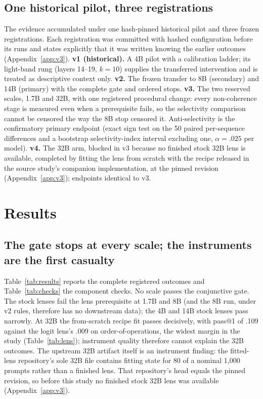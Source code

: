 \documentclass{article}
\begin{document}
\subsection{One historical pilot, three registrations}

The evidence accumulated under one hash-pinned historical pilot and three frozen
registrations. Each registration was committed with hashed configuration before its runs
and states explicitly that it was written knowing the earlier outcomes (Appendix~\ref{app:v3}).
\textbf{v1 (historical).} A 4B pilot with a calibration ladder; its light-band rung
(layers 14--19, $k=10$) supplies the transferred intervention and is treated as
descriptive context only. \textbf{v2.} The frozen transfer to 8B (secondary) and 14B
(primary) with the complete gate and ordered stops. \textbf{v3.} The two reserved scales,
1.7B and 32B, with one registered procedural change: every non-coherence stage is measured
even when a prerequisite fails, so the selectivity comparison cannot be censored the way
the 8B stop censored it. Anti-selectivity is the confirmatory primary endpoint (exact sign
test on the 50 paired per-sequence differences and a bootstrap selectivity-index interval
excluding one, $\alpha=.025$ per model). \textbf{v4.} The 32B arm, blocked in v3 because
no finished stock 32B lens is available, completed by fitting
the lens from scratch with the recipe released in the source study's companion
implementation, at the pinned revision (Appendix~\ref{app:v3}); endpoints identical to v3.

\section{Results}

\subsection{The gate stops at every scale; the instruments are the first casualty}

Table~\ref{tab:results} reports the complete registered outcomes and
Table~\ref{tab:checks} the component checks. No scale passes the conjunctive gate. The
stock lenses fail the lens prerequisite at 1.7B and 8B (and the 8B run, under v2 rules,
therefore has no downstream data); the 4B and 14B stock lenses pass narrowly. At 32B the
from-scratch recipe fit passes decisively, with pass@1 of .109 against the logit lens's
.009 on order-of-operations, the widest margin in the study (Table~\ref{tab:lens});
instrument quality therefore cannot explain the 32B outcomes. The upstream 32B artifact itself is an
instrument finding: the fitted-lens repository's sole 32B file contains fitting
state for 80 of a nominal 1,000 prompts rather than a finished lens. That repository's head
equals the pinned revision, so before this study no finished stock 32B lens was available
(Appendix~\ref{app:v3}).
\end{document}

